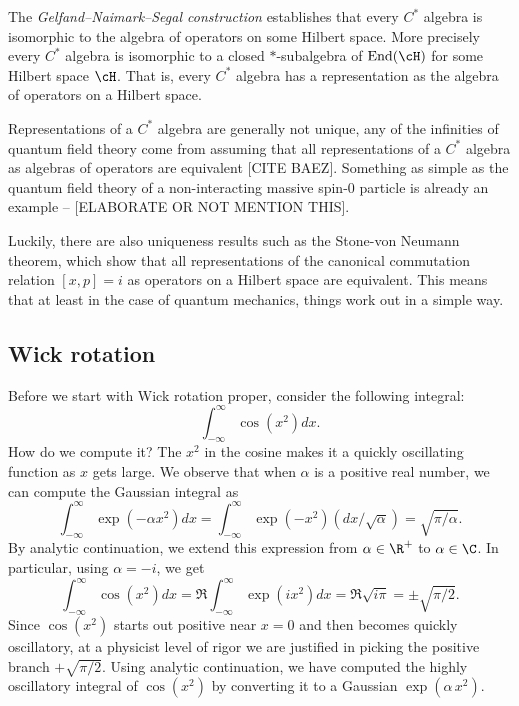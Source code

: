 The \emph{Gelfand–Naimark–Segal construction} establishes that every $C^*$ algebra is isomorphic to the algebra of operators on some Hilbert space. More precisely every $C^*$ algebra is isomorphic to a closed $*$-subalgebra of $\text{End}(\cH)$ for some Hilbert space $\cH$. That is, every $C^*$ algebra has a representation as the algebra of operators on a Hilbert space.

Representations of a $C^*$ algebra are generally not unique, any of the infinities of quantum field theory come from assuming that all representations of a $C^*$ algebra as algebras of operators are equivalent [CITE BAEZ]. Something as simple as the quantum field theory of a non-interacting massive spin-0 particle is already an example -- [ELABORATE OR NOT MENTION THIS].

Luckily, there are also uniqueness results such as the Stone-von Neumann theorem, which show that all representations of the canonical commutation relation $[x, p] = i$ as operators on a Hilbert space are equivalent. This means that at least in the case of  quantum mechanics, things work out in a simple way.


\subsection{Wick rotation}
Before we start with Wick rotation proper, consider the following integral:
\begin{equation*}
    \int_{-\infty}^{\infty}{\cos{(x^2)} dx}.
\end{equation*}
How do we compute it? The $x^2$ in the cosine makes it a quickly oscillating function as $x$ gets large. We observe that when $\alpha$ is a positive real number, we can compute the Gaussian integral as
\begin{equation*}
    \int_{-\infty}^{\infty}{\exp{(- \alpha x^2)}} dx = \int_{-\infty}^{\infty}{\exp{(- x^2)} (dx / \sqrt{\alpha})} = \sqrt{\pi / \alpha}.
\end{equation*}
By analytic continuation, we extend this expression from $\alpha \in \R^+$ to $\alpha \in \C$. In particular, using $\alpha = -i$, we get
\begin{equation*}
    \int_{-\infty}^{\infty}{\cos{(x^2)} dx} = \Re \int_{-\infty}^{\infty}{\exp{(i x^2)}} dx = \Re \sqrt{i \pi} = \pm\sqrt{\pi / 2}.
\end{equation*}
Since $\cos(x^2)$ starts out positive near $x = 0$ and then becomes quickly oscillatory, at a physicist level of rigor we are justified in picking the positive branch $+ \sqrt{\pi / 2}$. Using analytic continuation, we have computed the highly oscillatory integral of $\cos(x^2)$ by converting it to a Gaussian $\exp(\alpha \, x^2)$.

